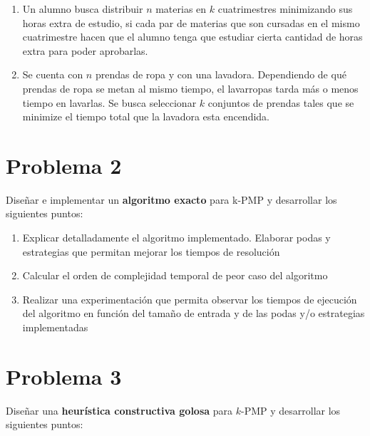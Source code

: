 \documentclass[11pt, a4paper, twoside]{article}
\begin{document}
\begin{enumerate}
\begin{enumerate}
					\item Un alumno busca distribuir $n$ materias en $k$ cuatrimestres minimizando
					sus horas extra de estudio, si cada par de materias que son cursadas en el mismo
					cuatrimestre hacen que el alumno tenga que estudiar cierta cantidad de horas extra
					para poder aprobarlas.
					
					\item Se cuenta con $n$ prendas de ropa y con una lavadora. Dependiendo de qué prendas
					de ropa se metan al mismo tiempo, el lavarropas tarda más o menos tiempo en lavarlas. Se busca 
					seleccionar $k$ conjuntos de prendas tales que se minimize el tiempo total que la 
					lavadora esta encendida.
				  \end{enumerate}
			\end{enumerate}
	


\newpage
\section{Problema 2}
	Diseñar e implementar un \textbf{algoritmo exacto} para k-PMP y desarrollar los siguientes puntos:
	\begin{enumerate}
	
		\item Explicar detalladamente el algoritmo implementado. Elaborar podas y estrategias que permitan mejorar
		      los tiempos de resolución
		\item Calcular el orden de complejidad temporal de peor caso del algoritmo
		\item Realizar una experimentación que permita observar los tiempos de ejecución del algoritmo en función
		      del tamaño de entrada y de las podas y/o estrategias implementadas
	\end{enumerate}	
			
			
\newpage
\section{Problema 3}
    
	Diseñar una \textbf{heurística constructiva golosa} para $k$-PMP y desarrollar los siguientes puntos:
    
\end{document}
